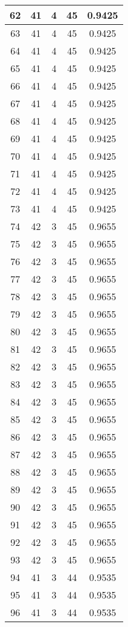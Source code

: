 \documentclass[letterpaper, 12pt]{article}
\begin{document}
\begin{longtable}{|c|c|c|c|c|}
\hline
62 & 41 & 4 & 45 & 0.9425 \\
\hline
63 & 41 & 4 & 45 & 0.9425 \\
\hline
64 & 41 & 4 & 45 & 0.9425 \\
\hline
65 & 41 & 4 & 45 & 0.9425 \\
\hline
66 & 41 & 4 & 45 & 0.9425 \\
\hline
67 & 41 & 4 & 45 & 0.9425 \\
\hline
68 & 41 & 4 & 45 & 0.9425 \\
\hline
69 & 41 & 4 & 45 & 0.9425 \\
\hline
70 & 41 & 4 & 45 & 0.9425 \\
\hline
71 & 41 & 4 & 45 & 0.9425 \\
\hline
72 & 41 & 4 & 45 & 0.9425 \\
\hline
73 & 41 & 4 & 45 & 0.9425 \\
\hline
74 & 42 & 3 & 45 & 0.9655 \\
\hline
75 & 42 & 3 & 45 & 0.9655 \\
\hline
76 & 42 & 3 & 45 & 0.9655 \\
\hline
77 & 42 & 3 & 45 & 0.9655 \\
\hline
78 & 42 & 3 & 45 & 0.9655 \\
\hline
79 & 42 & 3 & 45 & 0.9655 \\
\hline
80 & 42 & 3 & 45 & 0.9655 \\
\hline
81 & 42 & 3 & 45 & 0.9655 \\
\hline
82 & 42 & 3 & 45 & 0.9655 \\
\hline
83 & 42 & 3 & 45 & 0.9655 \\
\hline
84 & 42 & 3 & 45 & 0.9655 \\
\hline
85 & 42 & 3 & 45 & 0.9655 \\
\hline
86 & 42 & 3 & 45 & 0.9655 \\
\hline
87 & 42 & 3 & 45 & 0.9655 \\
\hline
88 & 42 & 3 & 45 & 0.9655 \\
\hline
89 & 42 & 3 & 45 & 0.9655 \\
\hline
90 & 42 & 3 & 45 & 0.9655 \\
\hline
91 & 42 & 3 & 45 & 0.9655 \\
\hline
92 & 42 & 3 & 45 & 0.9655 \\
\hline
93 & 42 & 3 & 45 & 0.9655 \\
\hline
94 & 41 & 3 & 44 & 0.9535 \\
\hline
95 & 41 & 3 & 44 & 0.9535 \\
\hline
96 & 41 & 3 & 44 & 0.9535 \\

\end{longtable}
\end{document}
